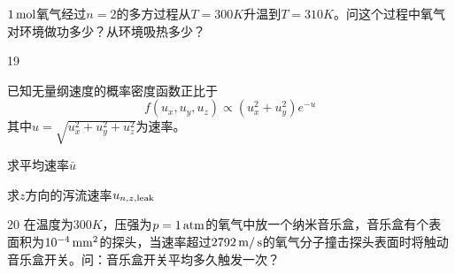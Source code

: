 \documentclass[CJK]{beamer}
\begin{document}
\begin{frame}
\bch
{}
$1\,\mathrm{mol}$氧气经过$n=2$的多方过程从$T=300K$升温到$T=310K$。问这个过程中氧气对环境做功多少？从环境吸热多少？
\ech
\end{frame}



\begin{frame}
\bch
{}
\ech
\end{frame}


\begin{frame}
\bch
\bitem
\item[19]{ 已知无量纲速度的概率密度函数正比于
$$f(u_x,u_y,u_z) \propto (u_x^2+u_y^2) e^{-u}$$
其中$u = \sqrt{u_x^2+u_y^2+u_z^2}$为速率。
\bitem
\item{求平均速率$\bar{u}$}
\item{求$z$方向的泻流速率$u_{n, z, \rm leak}$}
\eitem
}
\item[20]{在温度为$300K$，压强为$p=1\,\mathrm{atm}$的氧气中放一个纳米音乐盒，音乐盒有个表面积为$10^{-4}\,\mathrm{mm}^2$的探头，当速率超过$2792\,\mathrm{m}/\,\mathrm{s}$的氧气分子撞击探头表面时将触动音乐盒开关。问：音乐盒开关平均多久触发一次？}
\eitem
\ech
\end{frame}
\end{document}
